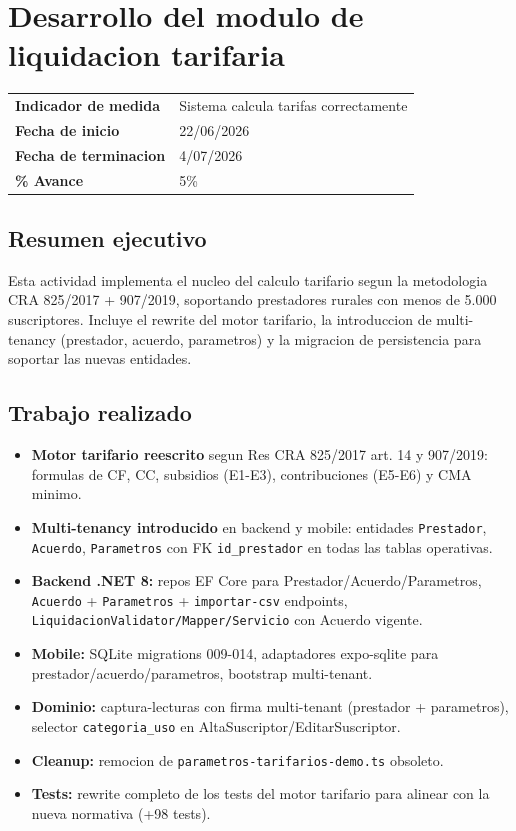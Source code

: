 \documentclass[11pt,a4paper,oneside]{report}
\begin{document}

\chapter{Desarrollo del modulo de liquidacion tarifaria}

\begin{tabularx}{\textwidth}{L{4cm} X}
\toprule
\textbf{Indicador de medida} & Sistema calcula tarifas correctamente \\
\textbf{Fecha de inicio} & 22/06/2026 \\
\textbf{Fecha de terminacion} & 4/07/2026 \\
\textbf{\% Avance} & 5\% \\
\bottomrule
\end{tabularx}

\section{Resumen ejecutivo}

Esta actividad implementa el nucleo del calculo tarifario segun la metodologia CRA 825/2017 + 907/2019, soportando prestadores rurales con menos de 5.000 suscriptores. Incluye el rewrite del motor tarifario, la introduccion de multi-tenancy (prestador, acuerdo, parametros) y la migracion de persistencia para soportar las nuevas entidades.

\section{Trabajo realizado}

\begin{itemize}[leftmargin=*]
    \item \textbf{Motor tarifario reescrito} segun Res CRA 825/2017 art. 14 y 907/2019: formulas de CF, CC, subsidios (E1-E3), contribuciones (E5-E6) y CMA minimo.
    \item \textbf{Multi-tenancy introducido} en backend y mobile: entidades \texttt{Prestador}, \texttt{Acuerdo}, \texttt{Parametros} con FK \texttt{id\_prestador} en todas las tablas operativas.
    \item \textbf{Backend .NET 8:} repos EF Core para Prestador/Acuerdo/Parametros, \texttt{Acuerdo} + \texttt{Parametros} + \texttt{importar-csv} endpoints, \texttt{LiquidacionValidator/Mapper/Servicio} con Acuerdo vigente.
    \item \textbf{Mobile:} SQLite migrations 009-014, adaptadores expo-sqlite para prestador/acuerdo/parametros, bootstrap multi-tenant.
    \item \textbf{Dominio:} captura-lecturas con firma multi-tenant (prestador + parametros), selector \texttt{categoria\_uso} en AltaSuscriptor/EditarSuscriptor.
    \item \textbf{Cleanup:} remocion de \texttt{parametros-tarifarios-demo.ts} obsoleto.
    \item \textbf{Tests:} rewrite completo de los tests del motor tarifario para alinear con la nueva normativa (+98 tests).
\end{itemize}
\end{document}
